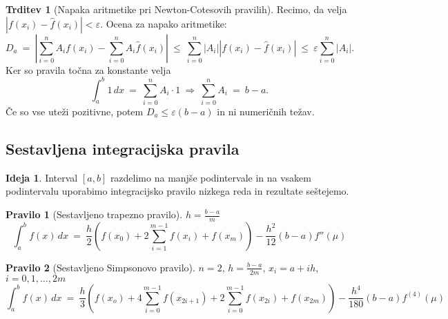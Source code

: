 \documentclass[11pt]{article}
\theoremstyle{definition}
\theoremstyle{definition}
\newtheorem*{pravilo}{Pravilo}
\newtheorem{trditev}{Trditev}[section]
\newtheorem*{ideja}{Ideja}
\begin{document}
\begin{trditev}[Napaka aritmetike pri Newton-Cotesovih pravilih]

Recimo, da velja $|f(x_i) - \hat{f}(x_i)| < \varepsilon$. Ocena za napako aritmetike:
$$D_a ~=~ \left| \sum_{i=0}^n A_i f(x_i) - \sum_{i=0}^n A_i \hat{f}(x_i) \right| ~\leq~ \sum_{i=0}^n |A_i| |f(x_i) - \hat{f}(x_i)| ~\leq~ \varepsilon \sum_{i=0}^n |A_i|.$$
Ker so pravila točna za konstante velja
$$\int_a^b 1\,dx ~=~ \sum_{i=0}^n A_i \cdot 1 ~\Rightarrow~ \sum_{i=0}^n A_i ~=~ b-a.$$
Če so vse uteži pozitivne, potem $D_a \leq \varepsilon(b-a)$ in ni numeričnih težav.

\end{trditev}
\vspace{0.5cm}


\subsection{Sestavljena integracijska pravila}
\vspace{0.5cm}

\begin{ideja}

Interval $[a, b]$ razdelimo na manjše podintervale in na vsakem podintervalu uporabimo integracijsko pravilo nizkega reda in rezultate seštejemo. 

\end{ideja}
\vspace{0.5cm}

\begin{pravilo}[Sestavljeno trapezno pravilo]

$h = \frac{b-a}{m}$
$$\int_a^b f(x)\,dx ~=~ \frac{h}{2} \left( f(x_0) + 2 \sum_{i=1}^{m-1} f(x_i) + f(x_m) \right) - \frac{h^2}{12} (b-a) f''(\mu)$$

\end{pravilo}
\vspace{0.5cm}

\begin{pravilo}[Sestavljeno Simpsonovo pravilo]

$n=2$, $h = \frac{b-a}{2m}$, $x_i = a + ih$, $i = 0, 1, \ldots, 2m$
$$\int_a^b f(x)\,dx ~=~ \frac{h}{3} \left( f(x_o) + 4 \sum_{i=0}^{m-1} f(x_{2i+1}) + 2 \sum_{i=0}^{m-1} f(x_{2i}) + f(x_{2m}) \right) - \frac{h^4}{180} (b-a) f^{(4)}(\mu)$$

\end{pravilo}
\vspace{0.5cm}
\end{document}
